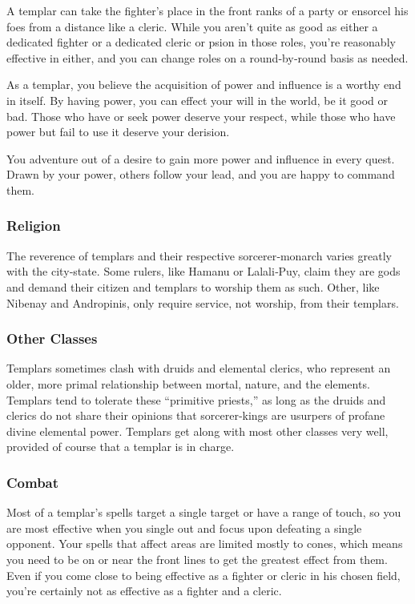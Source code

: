 A templar can take the fighter's place in the front ranks of a party or ensorcel his foes from a distance like a cleric. While you aren't quite as good as either a dedicated fighter or a dedicated cleric or psion in those roles, you're reasonably effective in either, and you can change roles on a round‐by‐round basis as needed.

As a templar, you believe the acquisition of power and influence is a worthy end in itself. By having power, you can effect your will in the world, be it good or bad. Those who have or seek power deserve your respect, while those who have power but fail to use it deserve your derision.

You adventure out of a desire to gain more power and influence in every quest. Drawn by your power, others follow your lead, and you are happy to command them.

\subsubsection{Religion}
The reverence of templars and their respective sorcerer‐monarch varies greatly with the city‐state. Some rulers, like Hamanu or Lalali‐Puy, claim they are gods and demand their citizen and templars to worship them as such. Other, like Nibenay and Andropinis, only require service, not worship, from their templars.

\subsubsection{Other Classes}
Templars sometimes clash with druids and elemental clerics, who represent an older, more primal relationship between mortal, nature, and the elements. Templars tend to tolerate these “primitive priests,” as long as the druids and clerics do not share their opinions that sorcerer‐kings are usurpers of profane divine elemental power. Templars get along with most other classes very well, provided of course that a templar is in charge.

\subsubsection{Combat}
Most of a templar's spells target a single target or have a range of touch, so you are most effective when you single out and focus upon defeating a single opponent. Your spells that affect areas are limited mostly to cones,
which means you need to be on or near the front lines to get the greatest effect from them. Even if you come close to being effective as a fighter or cleric in his chosen field, you're certainly not as effective as a fighter and a cleric.

